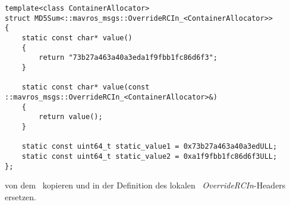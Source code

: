 \begin{lstlisting}[style=Style_CPP, numbers=none, caption=Definition des Struct \CodeStruct{MD5Sum} für das Template \textit{OverrideRCIn}]
template<class ContainerAllocator>
struct MD5Sum<::mavros_msgs::OverrideRCIn_<ContainerAllocator>>
{
	static const char* value()
	{
		return "73b27a463a40a3eda1f9fbb1fc86d6f3";
	}

	static const char* value(const ::mavros_msgs::OverrideRCIn_<ContainerAllocator>&)
	{
		return value();
	}
	
	static const uint64_t static_value1 = 0x73b27a463a40a3edULL;
	static const uint64_t static_value2 = 0xa1f9fbb1fc86d6f3ULL;
};
\end{lstlisting}

von dem \Pie\ kopieren und in der Definition des lokalen \ROS\ \textit{\mbox{OverrideRCIn}}-Headers ersetzen.














































